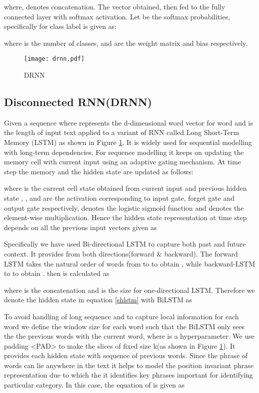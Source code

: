 \documentclass[sigconf]{acmart}
\begin{document}
where,  denotes concatenation. The vector  obtained, then fed to the fully connected layer with softmax activation. Let  be the softmax probabilities, specifically for class label  is given as:

where  is the number of classes,  and  are the weight matrix and bias respectively.
\begin{figure}[h]
    \centering
    \texttt{[image: drnn.pdf]}
    \caption{DRNN}
    \label{fig:drnn}
    \vspace{-2mm}
\end{figure}
\subsection{Disconnected RNN(DRNN)}\label{drnn}
Given a sequence  where  represents the d-dimensional word vector for word  and  is the length of input text applied to a variant of RNN called Long Short-Term Memory (LSTM)\cite{hochreiter1997long} as shown in Figure \ref{fig:drnn}. It is widely used for sequential modelling with long-term dependencies.  For sequence modelling it keeps on updating the memory cell with current input using an adaptive gating mechanism. At time step  the memory  and the hidden state  are updated as follows:


where  is the current cell state obtained from current input  and previous hidden state , ,  and  are the activation corresponding to input gate, forget gate and output gate respectively,  denotes the logistic sigmoid function and  denotes the element-wise multiplication.
Hence the hidden state representation at time step  depends on all the previous input vectors given as

Specifically we have used Bi-directional LSTM \cite{hochreiter1997long} to capture both past and future context. It provides  from both directions(forward \& backward). The forward LSTM takes the natural order of words from  to  to obtain , while backward-LSTM  to  to obtain . then  is calculated as

where  is the concatenation and  is the size for one-directional LSTM. Therefore we denote the hidden state in equation \ref{shlstm} with BiLSTM as 

To avoid handling of long sequence and to capture local information for each word we define the window size  for each word such that the BiLSTM only sees the the previous  words with the current word, where  is a hyperparameter\cite{wang2018disconnected}. We use padding <PAD> to make the slices of fixed size k(as shown in Figure \ref{fig:drnn}). It provides each hidden state  with sequence of  previous words. Since the phrase of  words can lie anywhere in the text it helps to model the position invariant phrase representation due to which the it identifies key phrases important for identifying particular category. In this case, the equation of  is given as 
\end{document}
